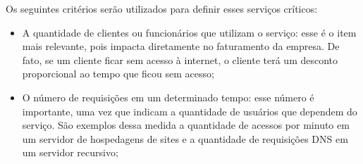 Os seguintes critérios serão utilizados para definir esses serviços críticos: 
\begin{itemize}
 \item A quantidade de clientes ou funcionários que utilizam o serviço: esse é o item mais relevante, pois impacta diretamente no faturamento
 da empresa. De fato, se um cliente ficar sem acesso à internet, o cliente terá um desconto proporcional ao tempo que ficou sem acesso; 
 \item O número de requisições em um determinado tempo: esse número é importante, uma vez que indicam a quantidade de usuários que dependem do 
 serviço. São exemplos dessa medida a quantidade de acessos por minuto em um servidor de hospedagens de sites e a quantidade de requisições 
 \ac{DNS} em um servidor recursivo;
\end{itemize}

